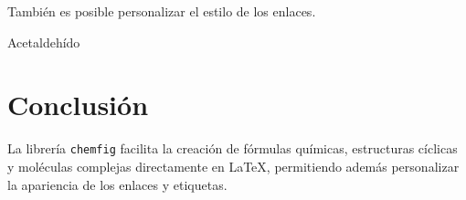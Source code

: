 \documentclass[12pt]{article}
\begin{document}
También es posible personalizar el estilo de los enlaces.

\bigskip

{\Large
{}

\chemname
    {}
    {Acetaldehído}
}

\section{Conclusión}

La librería \texttt{chemfig} facilita la creación de fórmulas químicas, estructuras cíclicas y moléculas complejas directamente en \LaTeX, permitiendo además personalizar la apariencia de los enlaces y etiquetas.
\end{document}
